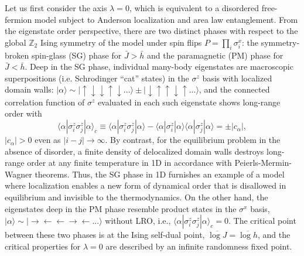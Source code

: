 \documentclass[amsmath,amssymb, aps, prb, superscriptaddress,twocolumn]{revtex4-1}
\begin{document}
Let us first consider the axis $\lambda = 0$, which is equivalent to a disordered free-fermion model subject to Anderson localization and area law entanglement. From the eigenstate order perspective, there are two distinct phases with respect to the global $\mathbb{Z}_2$ Ising symmetry of the model under spin flips $P = \prod_i\sigma_i^x$: the symmetry-broken spin-glass (SG) phase for $\bar{J} >\bar{h}$ and the  paramagnetic (PM) phase for $\bar{J} <\bar{h}$. Deep in the SG phase, individual many-body eigenstates are macroscopic superpositions (i.e. Schrodinger ``cat'' states) in the $\sigma^z$ basis with localized domain walls: $|\alpha \rangle \sim |\uparrow \downarrow \downarrow \uparrow \downarrow ... \rangle \pm |\downarrow \uparrow \uparrow \downarrow \uparrow ... \rangle $, and the connected correlation function of $\sigma^z$ evaluated in each such eigenstate shows long-range order with 
\begin{equation}
\langle \alpha| \sigma_i^z \sigma_j^z|\alpha\rangle_c\equiv\langle \alpha | \sigma_i^z \sigma_j^z | \alpha \rangle - \langle \alpha | \sigma_i^z| \alpha \rangle\langle \alpha | \sigma_j^z | \alpha \rangle = \pm |c_\alpha|,  
\label{eq:SG}
\end{equation} 
$|c_\alpha|>0$ even as $|i-j| \rightarrow \infty$.
By contrast, for the equilibrium problem in the absence of disorder, a finite density of delocalized domain walls destroys long-range order at any finite temperature in 1D in accordance with  Peierls-Mermin-Wagner theorems. Thus, the SG phase in 1D furnishes an example of a model where localization enables a new form of dynamical order that is disallowed in equilibrium and invisible to the thermodynamics\cite{Huse13, PekkerHilbertGlass}. 
On the other hand, the eigenstates deep in the PM phase resemble product states in the $\sigma^x$ basis,  $| \alpha \rangle \sim | \rightarrow \leftarrow \leftarrow \rightarrow \leftarrow ... \rangle$ without LRO, i.e., 
$\langle \alpha | \sigma_i^z \sigma_j^z|\alpha \rangle_c = 0$.
The critical point between these two phases is at the Ising self-dual point, $\overline{\log J} = \overline{\log h}$, and the critical properties 
for $\lambda=0$ are described by an infinite randomness fixed point\cite{Fisher95}.  
\end{document}
